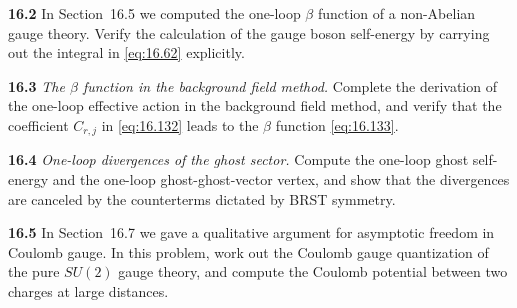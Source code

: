 \textbf{16.2} In Section~16.5 we computed the one-loop $\beta$ function of a
non-Abelian gauge theory.  Verify the calculation of the gauge boson
self-energy by carrying out the integral in \eqref{eq:16.62} explicitly.

\textbf{16.3} \emph{The $\beta$ function in the background field method.}
Complete the derivation of the one-loop effective action in the background
field method, and verify that the coefficient $C_{r,j}$ in \eqref{eq:16.132}
leads to the $\beta$ function \eqref{eq:16.133}.

\textbf{16.4} \emph{One-loop divergences of the ghost sector.}  Compute the
one-loop ghost self-energy and the one-loop ghost-ghost-vector vertex, and
show that the divergences are canceled by the counterterms dictated by BRST
symmetry.

\textbf{16.5} In Section~16.7 we gave a qualitative argument for asymptotic
freedom in Coulomb gauge.  In this problem, work out the Coulomb gauge
quantization of the pure $SU(2)$ gauge theory, and compute the Coulomb
potential between two charges at large distances.
